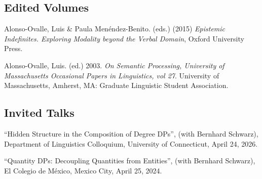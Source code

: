 \documentclass[11pt]{article}
\begin{document}




\subsection*{Edited Volumes}

Alonso-Ovalle, Luis \& Paula Men\'endez-Benito. (eds.) (2015) \emph{Epistemic Indefinites. Exploring Modality beyond the Verbal Domain}, Oxford University Press.

Alonso-Ovalle, Luis. (ed.) 2003. \emph{On Semantic Processing, University of Massachusetts Occasional Papers in Linguistics, vol 27}. University of Massachusetts, Amherst, MA: Graduate Linguistic Student Association.


\subsection*{Invited Talks}

``Hidden Structure in the Composition of Degree DPs'', (with Bernhard Schwarz), Department of Linguistics Colloquium, University of Connecticut, April 24, 2026.


``Quantity DPs: Decoupling Quantities from Entities'', (with Bernhard Schwarz), El Colegio de M\'exico, Mexico City, April 25, 2024.
\end{document}
